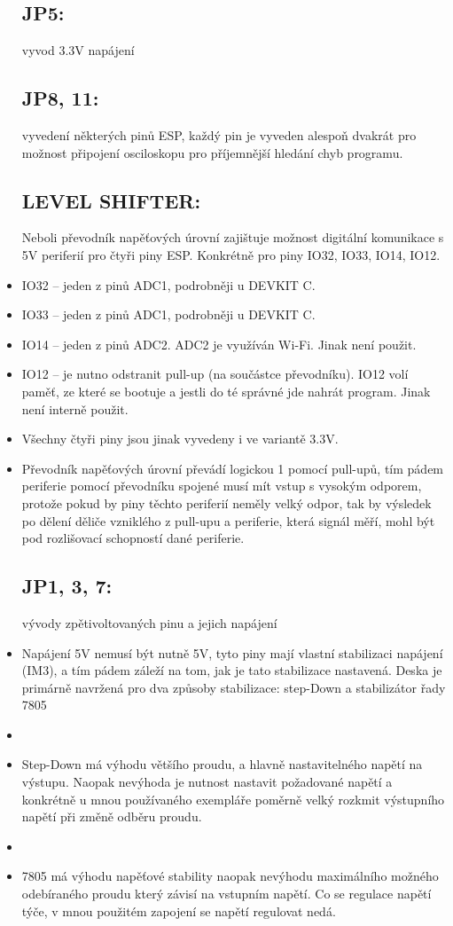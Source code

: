\documentclass{template/socthesis}
\begin{document}
\begin{itemize}
	\subsection*{JP5:}
	vyvod 3.3V napájení
	
	\subsection*{JP8, 11:}
	vyvedení některých pinů ESP, každý pin je vyveden alespoň dvakrát pro možnost připojení osciloskopu pro příjemnější hledání chyb programu.
	
	\subsection*{LEVEL SHIFTER:}
	Neboli převodník napěťových úrovní zajištuje možnost digitální komunikace s 5V periferií pro čtyři piny ESP. Konkrétně pro piny IO32, IO33, IO14, IO12.
	\item IO32 – jeden z pinů ADC1, podrobněji u DEVKIT C.
	\item IO33 – jeden z pinů ADC1, podrobněji u DEVKIT C.
	\item IO14 – jeden z pinů ADC2. ADC2 je využíván Wi-Fi. Jinak není použit.
	\item IO12 – je nutno odstranit pull-up (na součástce převodníku). IO12 volí paměť,
	ze které se bootuje a jestli do té správné jde nahrát program. Jinak není interně použit.
	\item Všechny čtyři piny jsou jinak vyvedeny i ve variantě 3.3V.
	\item Převodník napěťových úrovní převádí logickou 1 pomocí pull-upů, tím pádem periferie pomocí převodníku spojené musí mít vstup s vysokým odporem, protože pokud by piny těchto periferií neměly velký odpor, tak by výsledek po dělení děliče vzniklého z pull-upu a periferie, která signál měří, mohl být pod rozlišovací schopností dané periferie.
	
	\subsection*{JP1, 3, 7:}
	vývody zpětivoltovaných pinu a jejich napájení
	\item Napájení 5V nemusí být nutně 5V, tyto piny mají vlastní stabilizaci napájení (IM3), a tím pádem záleží na tom, jak je tato stabilizace nastavená. Deska je primárně navržená pro dva způsoby stabilizace: 
	step-Down a stabilizátor řady 7805
	\item \item Step-Down má výhodu většího proudu, a hlavně nastavitelného napětí na výstupu. Naopak nevýhoda je nutnost nastavit požadované napětí a konkrétně u mnou používaného exempláře poměrně velký rozkmit výstupního napětí při změně odběru proudu.
	\item \item 7805 má výhodu napěťové stability naopak nevýhodu maximálního možného odebíraného proudu který závisí na vstupním napětí. Co se regulace napětí týče, v mnou použitém zapojení se napětí regulovat nedá.
	

\end{itemize}
\end{document}
